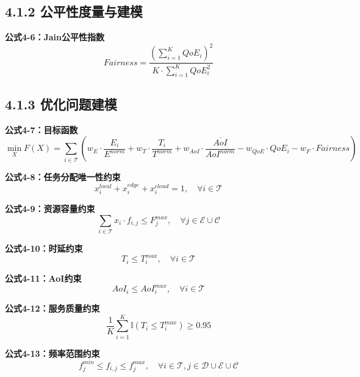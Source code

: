 \documentclass[12pt]{article}
\begin{document}
\subsection{4.1.2 公平性度量与建模}

\textbf{公式4-6：Jain公平性指数}
\begin{equation}
Fairness = \frac{\left(\sum_{i=1}^{K} QoE_i\right)^2}{K \cdot \sum_{i=1}^{K} QoE_i^2}
\end{equation}

\subsection{4.1.3 优化问题建模}

\textbf{公式4-7：目标函数}
\begin{equation}
\min_{X} F(X) = \sum_{i \in \mathcal{T}} \left( w_E \cdot \frac{E_i}{E^{norm}} + w_T \cdot \frac{T_i}{T^{norm}} + w_{AoI} \cdot \frac{\overline{AoI}}{AoI^{norm}} - w_{QoE} \cdot QoE_i - w_F \cdot Fairness \right)
\end{equation}

\textbf{公式4-8：任务分配唯一性约束}
\begin{equation}
x_i^{local} + x_i^{edge} + x_i^{cloud} = 1, \quad \forall i \in \mathcal{T}
\end{equation}

\textbf{公式4-9：资源容量约束}
\begin{equation}
\sum_{i \in \mathcal{T}} x_i \cdot f_{i,j} \leq F_j^{max}, \quad \forall j \in \mathcal{E} \cup \mathcal{C}
\end{equation}

\textbf{公式4-10：时延约束}
\begin{equation}
T_i \leq T_i^{max}, \quad \forall i \in \mathcal{T}
\end{equation}

\textbf{公式4-11：AoI约束}
\begin{equation}
AoI_i \leq AoI_i^{max}, \quad \forall i \in \mathcal{T}
\end{equation}

\textbf{公式4-12：服务质量约束}
\begin{equation}
\frac{1}{K} \sum_{i=1}^{K} \mathbb{I}(T_i \leq T_i^{max}) \geq 0.95
\end{equation}

\textbf{公式4-13：频率范围约束}
\begin{equation}
f_j^{min} \leq f_{i,j} \leq f_j^{max}, \quad \forall i \in \mathcal{T}, j \in \mathcal{D} \cup \mathcal{E} \cup \mathcal{C}
\end{equation}
\end{document}
